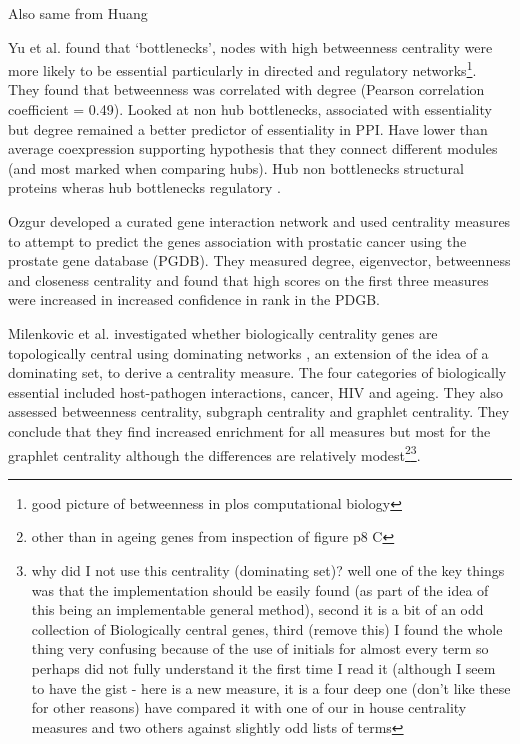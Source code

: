     
Also same from Huang


Yu et al.\cite{yu2007importance} found that `bottlenecks', nodes with high betweenness centrality were more likely to be essential particularly in directed and regulatory networks\footnote{good picture of betweenness in plos computational biology}. They found that betweenness was correlated with degree (Pearson correlation coefficient = 0.49). Looked at non hub bottlenecks, associated with essentiality but degree remained a better predictor of essentiality in PPI. Have lower than average coexpression supporting hypothesis that they connect different modules (and most marked when comparing hubs). Hub non bottlenecks structural proteins wheras hub bottlenecks regulatory .

Ozgur\cite{ozgur2008identifying} developed a curated gene interaction network and used centrality measures to attempt to predict the genes association with prostatic cancer using the prostate gene database (PGDB). They measured degree, eigenvector, betweenness and closeness centrality and found that high scores on the first three measures were increased in increased confidence in rank in the PDGB.

Milenkovic et al.\cite{milenkovic2011dominating} investigated whether biologically centrality genes are topologically central using dominating networks , an extension of the idea of a dominating set, to derive a centrality measure. The four categories of biologically essential included host-pathogen interactions, cancer, HIV and ageing. They also assessed betweenness centrality, subgraph centrality and graphlet centrality. They conclude that they find increased enrichment for all measures but most for the graphlet centrality although the differences are relatively modest\footnote{ other than in ageing genes from inspection of figure p8 C}\footnote{why did I not use this centrality (dominating set)? well one of the key things was that the implementation should be easily found (as part of the idea of this being an implementable general method), second it is a bit of an odd collection of Biologically central genes, third (remove this) I found the whole thing very confusing because of the use of initials for almost every term so perhaps did not fully understand it the first time I read it (although I seem to have the gist - here is a new measure, it is a four deep one (don't like these for other reasons) have compared it with one of our in house centrality measures and two others against slightly odd lists of terms}.  

